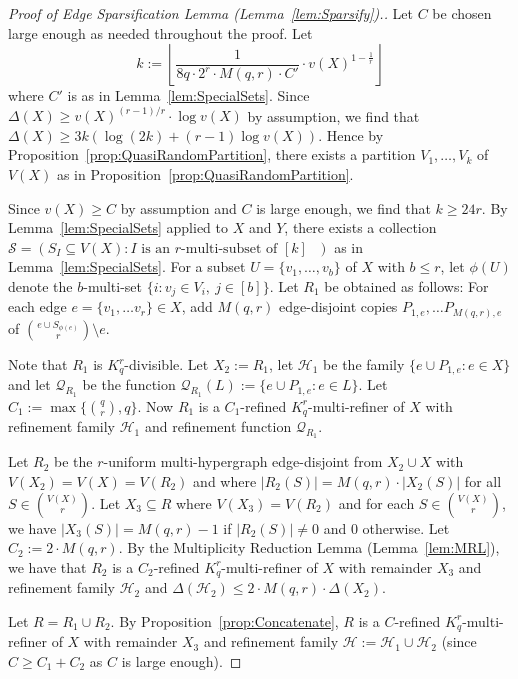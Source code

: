 \documentclass[11pt]{article}
\newcounter{i}
\theoremstyle{plain}
\theoremstyle{plain} %
\theoremstyle{definition}
\begin{document}
\begin{proof}[Proof of Edge Sparsification Lemma (Lemma~\ref{lem:Sparsify}).]
Let $C$ be chosen large enough as needed throughout the proof. Let $$k:=\left\lfloor \frac{1}{8q\cdot 2^r\cdot M(q,r)\cdot C'}\cdot v(X)^{1-\frac{1}{r}}\right\rfloor$$ 
where $C'$ is as in Lemma~\ref{lem:SpecialSets}. Since $\Delta(X)\ge v(X)^{(r-1)/r}\cdot \log v(X)$ by assumption, we find that $\Delta(X) \ge 3k(\log(2k)+(r-1)\log v(X))$. Hence by Proposition~\ref{prop:QuasiRandomPartition}, there exists a partition $V_1,\ldots, V_k$ of $V(X)$ as in Proposition~\ref{prop:QuasiRandomPartition}. 

Since $v(X)\ge C$ by assumption and $C$ is large enough, we find that $k \ge 24r$. By Lemma~\ref{lem:SpecialSets} applied to $X$ and $Y$, there exists a collection $\mathcal{S}=(S_I \subseteq V(X): I \text { is an $r$-multi-subset of $[k]$ })$ as in Lemma~\ref{lem:SpecialSets}. For a subset $U=\{v_1,\ldots, v_b\}$ of $X$ with $b\le r$, let $\phi(U)$ denote the $b$-multi-set $\{i: v_j\in V_i,~j \in [b]\}$. Let $R_1$ be obtained as follows: For each edge $e = \{v_1,\ldots v_r\}\in X$, add $M(q,r)$ edge-disjoint copies $P_{1,e},\ldots P_{M(q,r),e}$ of $\binom{e\cup S_{\phi(e)}}{r} \setminus e$.  

Note that $R_1$ is $K_q^r$-divisible. Let $X_2:=R_1$, let $\mathcal{H}_1$ be the family $\{ e\cup P_{1,e}: e\in X\}$ and let $\mathcal{Q}_{R_1}$ be the function $\mathcal{Q}_{R_1}(L) := \{ e\cup P_{1,e}: e\in L\}$. Let $C_1:= \max\{\binom{q}{r},q\}$. Now $R_1$ is a $C_1$-refined $K_q^r$-multi-refiner of $X$ with refinement family $\mathcal{H}_1$ and refinement function $\mathcal{Q}_{R_1}$. 


Let $R_2$ be the $r$-uniform multi-hypergraph edge-disjoint from $X_2\cup X$ with $V(X_2)=V(X)=V(R_2)$ and where $|R_2(S)|= M(q,r)\cdot |X_2(S)|$ for all $S\in \binom{V(X)}{r}$. Let $X_3\subseteq R$ where $V(X_3)=V(R_2)$ and for each $S\in \binom{V(X)}{r}$, we have $|X_3(S)| = M(q,r)-1$ if $|R_2(S)|\ne 0$ and $0$ otherwise. Let $C_2:= 2\cdot M(q,r)$. By the Multiplicity Reduction Lemma (Lemma~\ref{lem:MRL}), we have that $R_2$ is a $C_2$-refined $K_q^r$-multi-refiner of $X$ with remainder $X_3$ and refinement family $\mathcal{H}_2$ and $\Delta(\mathcal{H}_2) \le 2\cdot M(q,r)\cdot \Delta(X_2)$.

Let $R=R_1\cup R_2$. By Proposition~\ref{prop:Concatenate}, $R$ is a $C$-refined $K_q^r$-multi-refiner of $X$ with remainder $X_3$ and refinement family $\mathcal{H}:=\mathcal{H}_1\cup \mathcal{H}_2$ (since $C\ge C_1+C_2$ as $C$ is large enough).


\end{proof}
\end{document}
